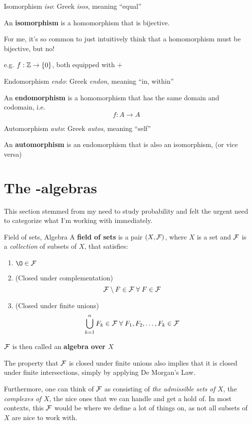\documentclass[a4paper, 10pt]{article}
\begin{document}
\begin{definition} {Isomorphism}
    \textit{iso}: Greek \textit{isos}, meaning ``equal''

    An \textbf{isomorphism} is a homomorphism that is bijective.
\end{definition}

\begin{remark}
    For me, it's so common to just intuitively think that a homomorphism must be bijective, but no!

    e.g. \(f: \mathbb{Z} \to \{0\}\), both equipped with \(+\)
\end{remark}

\begin{definition} {Endomorphism}
    \textit{endo}: Greek \textit{endon}, meaning ``in, within''

    An \textbf{endomorphism} is a homomorphism that has the same domain and codomain, i.e. \[
        f: A \to A
    \]
\end{definition}

\begin{definition} {Automorphism}
    \textit{auto}: Greek \textit{autos}, meaning ``self''

    An \textbf{automorphism} is an endomorphism that is also an isomorphism, (or vice versa)
\end{definition}

\section{The -algebras}
This section stemmed from my need to study probability and felt the urgent need to categorize what I'm working with immediately.

\begin{definition} {Field of sets, Algebra}
    A \textbf{field of sets} is a pair \((X, \mathcal{F})\), where \(X\) is a set and \(\mathcal{F}\) is a \textit{collection} of subsets of \(X\), that satisfies:
    \begin{enumerate}
        \item \(\O \in \calf\)
        \item (Closed under complementation) \[\calf \setminus F \in \calf \forall F \in \calf\]
        \item (Closed under finite unions) \[\bigcup_{k=1}^n F_k \in \calf \forall F_1, F_2, \dots, F_k \in \calf\]
    \end{enumerate}

    \(\mathcal{F}\) is then called an \textbf{algebra over \(X\)}
\end{definition}
\begin{remark}
    The property that \(\mathcal{F}\) is closed under finite unions also implies that it is closed under finite intersections, simply by applying De Morgan's Law.

    Furthermore, one can think of \(\mathcal{F}\) as consisting of \textit{the admissible sets of \(X\)}, the \textit{complexes of \(X\)}, the nice ones that we can handle and get a hold of. In most contexts, this \(\mathcal{F}\) would be where we define a lot of things on, as not all subsets of \(X\) are nice to work with.
\end{remark}
\end{document}
